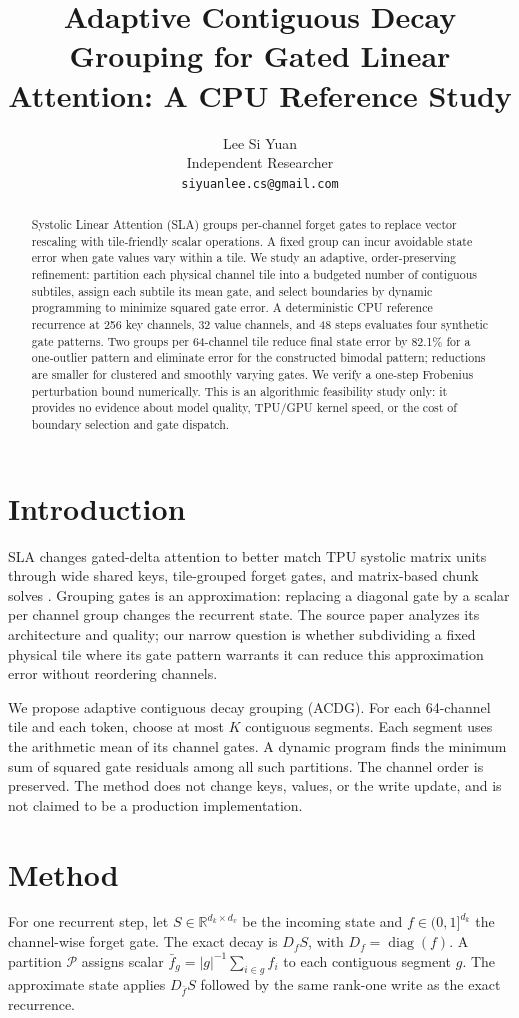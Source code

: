 \documentclass[11pt]{article}
\title{Adaptive Contiguous Decay Grouping for Gated Linear Attention: A CPU Reference Study}
\author{Lee Si Yuan \\
  Independent Researcher \\
  \texttt{siyuanlee.cs@gmail.com}}
\begin{document}
\maketitle
\begin{abstract}
Systolic Linear Attention (SLA) groups per-channel forget gates to replace vector rescaling with tile-friendly scalar operations. A fixed group can incur avoidable state error when gate values vary within a tile. We study an adaptive, order-preserving refinement: partition each physical channel tile into a budgeted number of contiguous subtiles, assign each subtile its mean gate, and select boundaries by dynamic programming to minimize squared gate error. A deterministic CPU reference recurrence at 256 key channels, 32 value channels, and 48 steps evaluates four synthetic gate patterns. Two groups per 64-channel tile reduce final state error by 82.1\% for a one-outlier pattern and eliminate error for the constructed bimodal pattern; reductions are smaller for clustered and smoothly varying gates. We verify a one-step Frobenius perturbation bound numerically. This is an algorithmic feasibility study only: it provides no evidence about model quality, TPU/GPU kernel speed, or the cost of boundary selection and gate dispatch.
\end{abstract}
\section{Introduction}
SLA changes gated-delta attention to better match TPU systolic matrix units through wide shared keys, tile-grouped forget gates, and matrix-based chunk solves \citep{amirkhanyan2026sla}. Grouping gates is an approximation: replacing a diagonal gate by a scalar per channel group changes the recurrent state. The source paper analyzes its architecture and quality; our narrow question is whether subdividing a fixed physical tile where its gate pattern warrants it can reduce this approximation error without reordering channels.

We propose adaptive contiguous decay grouping (ACDG). For each 64-channel tile and each token, choose at most $K$ contiguous segments. Each segment uses the arithmetic mean of its channel gates. A dynamic program finds the minimum sum of squared gate residuals among all such partitions. The channel order is preserved. The method does not change keys, values, or the write update, and is not claimed to be a production implementation.
\section{Method}
For one recurrent step, let $S\in\mathbb{R}^{d_k\times d_v}$ be the incoming state and $f\in(0,1]^{d_k}$ the channel-wise forget gate. The exact decay is $D_f S$, with $D_f=\operatorname{diag}(f)$. A partition $\mathcal{P}$ assigns scalar $\bar f_g=|g|^{-1}\sum_{i\in g}f_i$ to each contiguous segment $g$. The approximate state applies $D_{\bar f}S$ followed by the same rank-one write as the exact recurrence.
\end{document}
